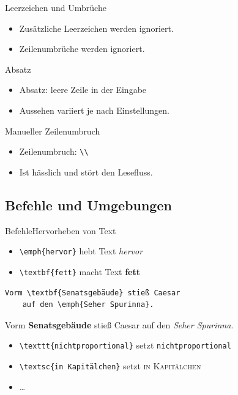 \begin{Frame}[fragile]{Leerzeichen und Umbrüche}
  \begin{itemize}
    \item Zusätzliche \alert{Leerzeichen} werden ignoriert.
    \item \alert{Zeilenumbrüche} werden ignoriert.
  \end{itemize}

  \xxx

  \begin{exampleblock}{Absatz}
    \begin{itemize}
      \item \alert{Absatz}: leere Zeile in der Eingabe
      \item Aussehen variiert je nach Einstellungen.
    \end{itemize}
  \end{exampleblock}

  \xxx

  \begin{alertblock}{Manueller Zeilenumbruch}
    \begin{itemize}
      \item \alert{Zeilenumbruch}: \lstinline-\\-
      \item Ist \alert{hässlich} und \alert{stört} den Lesefluss.
    \end{itemize}
  \end{alertblock}
\end{Frame}

\subsection{Befehle und Umgebungen}

\begin{Frame}[fragile]{Befehle}{Hervorheben von Text}
  \begin{itemize}
    \item \lstinline-\emph{hervor}- hebt Text \emph{hervor}
    \item \lstinline-\textbf{fett}- macht Text \textbf{fett}
  \end{itemize}

  \xxx

  \begin{lstlisting}[gobble=4]
    Vorm \textbf{Senatsgebäude} stieß Caesar
    auf den \emph{Seher Spurinna}.
  \end{lstlisting}

  Vorm \textbf{Senatsgebäude} stieß Caesar
    auf den \emph{Seher Spurinna}.

  \xxx\pause

  \begin{itemize}
    \item \lstinline-\texttt{nichtproportional}- setzt \texttt{nichtproportional}
    \item \lstinline-\textsc{in Kapitälchen}- setzt \textsc{in Kapitälchen}
    \item \ldots
  \end{itemize}
\end{Frame}

